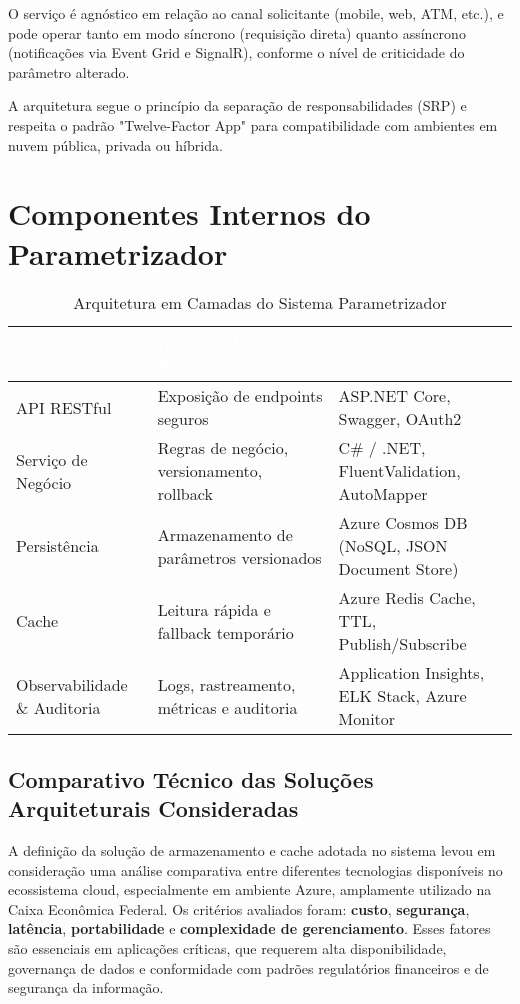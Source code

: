 O serviço é agnóstico em relação ao canal solicitante (mobile, web, ATM, etc.), e pode operar tanto em modo síncrono (requisição direta) quanto assíncrono (notificações via Event Grid e SignalR), conforme o nível de criticidade do parâmetro alterado.

A arquitetura segue o princípio da separação de responsabilidades (SRP) e respeita o padrão "Twelve-Factor App" para compatibilidade com ambientes em nuvem pública, privada ou híbrida.

\section{Componentes Internos do Parametrizador}

\begin{table}[h]
	\centering
	\caption{Arquitetura em Camadas do Sistema Parametrizador}
	\label{tab:arquitetura_camadas}
	\begin{tabular}{p{4cm}p{6cm}p{5cm}}
		\toprule
		\rowcolor{headerpurple}
		\textcolor{white}{\textbf{Camada}} & \textcolor{white}{\textbf{Responsabilidade Principal}} & \textcolor{white}{\textbf{Tecnologias Utilizadas}} \\
		\midrule
		API RESTful & Exposição de endpoints seguros & ASP.NET Core, Swagger, OAuth2 \\
		\rowcolor{lightpurple}
		Serviço de Negócio & Regras de negócio, versionamento, rollback & C\# / .NET, FluentValidation, AutoMapper \\
		Persistência & Armazenamento de parâmetros versionados & Azure Cosmos DB (NoSQL, JSON Document Store) \\
		\rowcolor{lightpurple}
		Cache & Leitura rápida e fallback temporário & Azure Redis Cache, TTL, Publish/Subscribe \\
		Observabilidade \& Auditoria & Logs, rastreamento, métricas e auditoria & Application Insights, ELK Stack, Azure Monitor \\
		\bottomrule
	\end{tabular}
\end{table}

\subsection*{Comparativo Técnico das Soluções Arquiteturais Consideradas}

A definição da solução de armazenamento e cache adotada no sistema levou em consideração uma análise comparativa entre diferentes tecnologias disponíveis no ecossistema cloud, especialmente em ambiente Azure, amplamente utilizado na Caixa Econômica Federal. Os critérios avaliados foram: \textbf{custo}, \textbf{segurança}, \textbf{latência}, \textbf{portabilidade} e \textbf{complexidade de gerenciamento}. Esses fatores são essenciais em aplicações críticas, que requerem alta disponibilidade, governança de dados e conformidade com padrões regulatórios financeiros e de segurança da informação.

